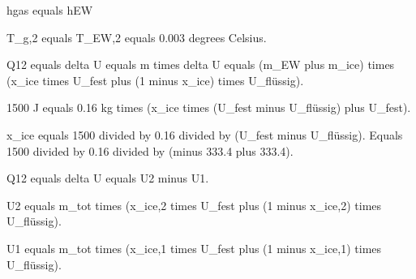 hgas equals hEW

T_g,2 equals T_EW,2 equals 0.003 degrees Celsius.  

Q12 equals delta U equals m times delta U equals (m_EW plus m_ice) times (x_ice times U_fest plus (1 minus x_ice) times U_flüssig).  

1500 J equals 0.16 kg times (x_ice times (U_fest minus U_flüssig) plus U_fest).  

x_ice equals 1500 divided by 0.16 divided by (U_fest minus U_flüssig).  
Equals 1500 divided by 0.16 divided by (minus 333.4 plus 333.4).  

Q12 equals delta U equals U2 minus U1.  

U2 equals m_tot times (x_ice,2 times U_fest plus (1 minus x_ice,2) times U_flüssig).  

U1 equals m_tot times (x_ice,1 times U_fest plus (1 minus x_ice,1) times U_flüssig).